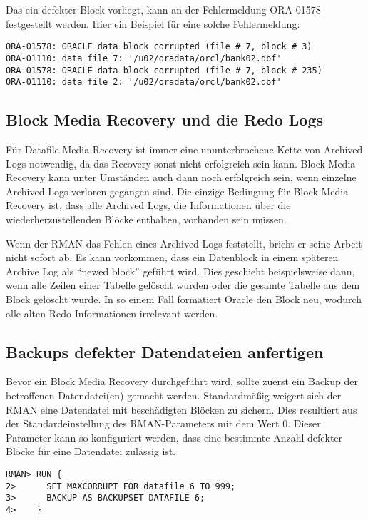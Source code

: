         Das ein defekter Block vorliegt, kann an der Fehlermeldung ORA-01578 festgestellt werden. Hier ein Beispiel f\"ur eine solche Fehlermeldung:
        \begin{lstlisting}[caption={Der Fehler ORA-01578},label=admin1492,language=terminal]
ORA-01578: ORACLE data block corrupted (file # 7, block # 3)
ORA-01110: data file 7: '/u02/oradata/orcl/bank02.dbf'
ORA-01578: ORACLE data block corrupted (file # 7, block # 235)
ORA-01110: data file 2: '/u02/oradata/orcl/bank02.dbf'
        \end{lstlisting}
      \subsection{Block Media Recovery und die Redo Logs}
        F\"ur Datafile Media Recovery ist immer eine ununterbrochene Kette von Archived Logs notwendig, da das Recovery sonst nicht erfolgreich sein kann. Block Media Recovery kann unter Umst\"anden auch dann noch erfolgreich sein, wenn einzelne Archived Logs verloren gegangen sind. Die einzige Bedingung f\"ur Block Media Recovery ist, dass alle Archived Logs, die Informationen \"uber die wiederherzustellenden Bl\"ocke enthalten, vorhanden sein m\"ussen.

        Wenn der RMAN das Fehlen eines Archived Logs feststellt, bricht er seine Arbeit nicht sofort ab. Es kann vorkommen, dass ein Datenblock in einem sp\"ateren Archive Log als \enquote{newed block} gef\"uhrt wird. Dies geschieht beispielsweise dann, wenn alle Zeilen einer Tabelle gel\"oscht wurden oder die gesamte Tabelle aus dem Block gel\"oscht wurde.
        In so einem Fall formatiert Oracle den Block neu, wodurch alle alten Redo Informationen irrelevant werden.
      \subsection{Backups defekter Datendateien anfertigen}
        \label{corruptfile}
        Bevor ein Block Media Recovery durchgef\"uhrt wird, sollte zuerst ein Backup der betroffenen Datendatei(en) gemacht werden. Standardm\"a\ss{}ig weigert sich der RMAN eine Datendatei mit besch\"adigten Bl\"ocken zu sichern. Dies resultiert aus der Standardeinstellung des RMAN-Parameters  mit dem Wert 0. Dieser Parameter kann so konfiguriert werden, dass eine bestimmte Anzahl defekter Bl\"ocke f\"ur eine Datendatei zul\"assig ist.
        \begin{lstlisting}[caption={Hotbackup einer defekten Datendatei anfertigen},label=admin1493,language=rman]
RMAN> RUN {
2>      SET MAXCORRUPT FOR datafile 6 TO 999;
3>      BACKUP AS BACKUPSET DATAFILE 6;
4>    }
        \end{lstlisting}
